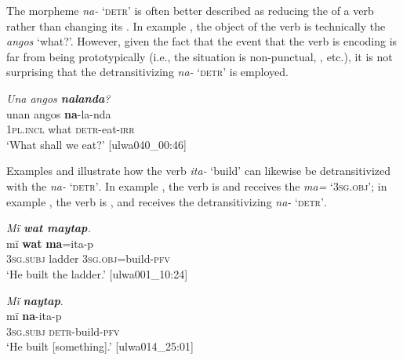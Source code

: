 The morpheme \textit{na-} \textsc{‘detr’} is often better described as reducing the  of a verb rather than changing its . In example , the object of the verb is technically the  \textit{angos} ‘what?’. However, given the fact that the event that the verb is encoding is far from being prototypically  (i.e., the situation is non-punctual, , etc.), it is not surprising that the detransitivizing  \textit{na-} \textsc{‘detr’} is employed.

\ea%
    \label{ex:syntax:309}
          \textit{Una angos \textbf{nalanda}?}\\
\gll unan    angos  \textbf{na}{}-la-nda\\
    1\textsc{pl.incl}  what  \textsc{detr}{}-eat-\textsc{irr}\\
\glt `What shall we eat?’ [ulwa040\_00:46]
\z

Examples  and  illustrate how the verb \textit{ita-} ‘build’ can likewise be detransitivized with the  \textit{na-} \textsc{‘detr’}. In example , the verb is  and receives the  \textit{ma=} ‘3\textsc{sg.obj}’; in example , the verb is , and receives the detransitivizing  \textit{na-} \textsc{‘detr’}.


\ea%
    \label{ex:syntax:310}
          \textit{Mï \textbf{wat maytap}.}\\
\gll mï      \textbf{wat}  \textbf{ma}=ita-p\\
    3\textsc{sg.subj}  ladder  3\textsc{sg.obj}=build-\textsc{pfv}\\
\glt `He built the ladder.’ [ulwa001\_10:24]
\z

\ea%
    \label{ex:syntax:311}
          \textit{Mï} \textbf{\textit{naytap}}.\\
\gll mï      \textbf{na}{}-ita-p\\
    3\textsc{sg.subj}  \textsc{detr-}build-\textsc{pfv}\\
\glt `He built [something].’ [ulwa014\_25:01]
\z

